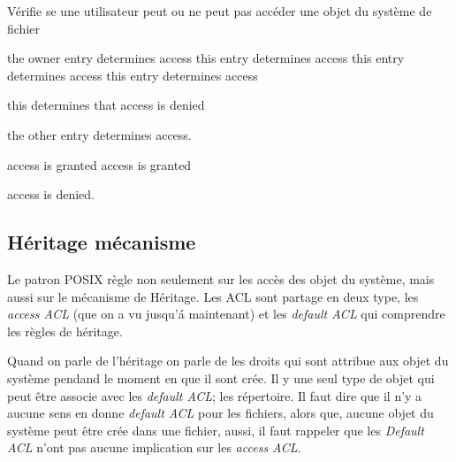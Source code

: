 \begin{algorithm}
\caption{Vérifie se une utilisateur peut ou ne peut pas accéder une objet du système de fichier}
\label{algacl}
\begin{algorithmic}
	\STATE the owner entry determines access
	\STATE this entry determines access 
	\STATE this entry determines access
	\STATE this entry determines access
 
\STATE this determines that access is denied

\ELSE
	\STATE the other entry determines access.
\ENDIF
 

	\STATE access is granted 
	\STATE access is granted
 
\ELSE
	\STATE access is denied.
\ENDIF
\end{algorithmic}
\end{algorithm}


\subsection*{Héritage mécanisme}

Le patron POSIX règle non seulement sur les accès des objet du système, mais aussi sur le mécanisme de Héritage. Les ACL sont partage en deux type, les \emph{access ACL} (que on a vu jusqu'á maintenant) et les \emph{default ACL} qui comprendre les règles de héritage.  

Quand on parle de l'héritage on parle de les droits qui sont attribue aux objet du système pendand le moment en que il sont crée. Il y une seul type de objet qui peut être associe avec les \emph{default ACL}; les répertoire. Il faut dire que il n'y a aucune sens en donne \emph{default ACL } pour les fichiers, alors que, aucune objet du système peut être crée dans une fichier, aussi, il faut rappeler que les \emph{Default ACL} n'ont pas aucune implication sur les \emph{access ACL}.

